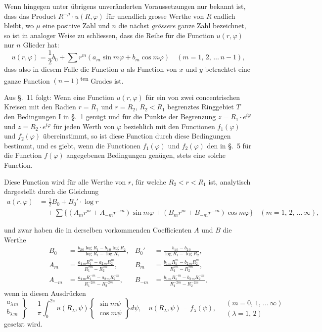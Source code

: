 \documentclass{article}
\begin{document}
Wenn hingegen unter übrigens unveränderten Voraussetzungen nur bekannt ist, dass das Product $R^{-\mu} \cdot u(R, \varphi)$ für unendlich grosse Werthe von $R$ endlich bleibt, wo $\mu$ eine positive Zahl und $n$ die nächst \emph{grössere} ganze Zahl bezeichnet, so ist in analoger Weise zu schliessen, dass die Reihe für die Function $u(r, \varphi)$ nur $n$ Glieder hat:
\[
u(r, \varphi) = \frac{1}{2} b_0 + \sum r^m (a_m \sin m\varphi + b_m \cos m\varphi) \quad (m = 1, \, 2, \, \dots \, n - 1),
\]
dass also in diesem Falle die Function $u$ als Function von $x$ und $y$ betrachtet eine ganze Function $(n - 1)$\textsuperscript{ten} Grades ist.

Aus §.~11 folgt: Wenn eine Function $u(r, \varphi)$ für ein von zwei concentrischen Kreisen mit den Radien $r = R_1$ und $r = R_2$, $R_2 < R_1$ begrenztes Ringgebiet $T$ den Bedingungen I in §.~1 genügt und für die Punkte der Begrenzung $z = R_1 \cdot e^{i\varphi}$ und $z = R_2 \cdot e^{i\varphi}$ für jeden Werth von $\varphi$ beziehlich mit den Functionen $f_1(\varphi)$ und $f_2(\varphi)$ übereinstimmt, so ist diese Function durch diese Bedingungen bestimmt, und es giebt, wenn die Functionen $f_1(\varphi)$ und $f_2(\varphi)$ den in §.~5 für die Function $f(\varphi)$ angegebenen Bedingungen genügen, stets eine solche Function.

Diese Function wird für alle Werthe von $r$, für welche $R_2 < r < R_1$ ist, analytisch dargestellt durch die Gleichung
\[
\begin{aligned}
u(r, \varphi) &= \frac{1}{2} B_0 + B_0' \cdot \log r \\
&\quad + \sum \{(A_m r^m + A_{-m} r^{-m}) \sin m\varphi + (B_m r^m + B_{-m} r^{-m}) \cos m\varphi\} \quad (m = 1, \, 2, \, \dots \, \infty),
\end{aligned}
\]

und zwar haben die in derselben vorkommenden Coefficienten $A$ und $B$ die Werthe
\[
\begin{aligned}
B_0 &= \frac{b_{2\,0} \log R_1 - b_{1\,0} \log R_2}{\log R_1 - \log R_2}, & B_0' &= \frac{b_{1\,0} - b_{2\,0}}{\log R_1 - \log R_2}, \\
A_m &= \frac{a_{1\,m} R_1^m - a_{2\,m} R_2^m}{R_1^{2m} - R_2^{2m}}, & B_m &= \frac{b_{1\,m} R_1^m - b_{2\,m} R_2^m}{R_1^{2m} - R_2^{2m}}, \\
A_{-m} &= \frac{a_{1\,m} R_1^{-m} - a_{2\,m} R_2^{-m}}{R_1^{-2m} - R_2^{-2m}}, & B_{-m} &= \frac{b_{1\,m} R_1^{-m} - b_{2\,m} R_2^{-m}}{R_1^{-2m} - R_2^{-2m}},
\end{aligned}
\]
wenn in diesen Ausdrücken
\[
\left. \begin{array}{c} a_{\lambda\,m} \\ b_{\lambda\,m} \end{array} \right\} = \frac{1}{\pi} \int_0^{2\pi} u(R_\lambda, \psi) \left\{ \begin{array}{c} \sin m\psi \\ \cos m\psi \end{array} \right\} d\psi, \quad u(R_\lambda, \psi) = f_\lambda(\psi), \quad \begin{array}{c} (m = 0, \, 1, \, \dots \, \infty) \\ (\lambda = 1, \, 2) \end{array}
\]
gesetzt wird.
\end{document}
